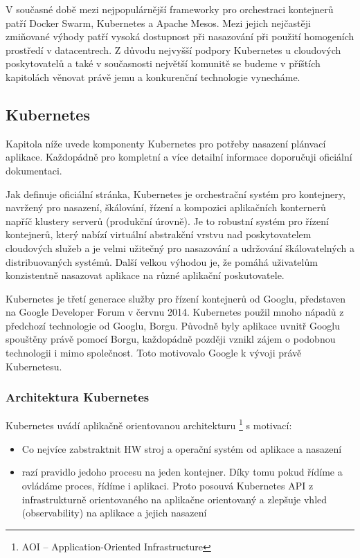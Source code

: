 \documentclass[thesis=M,czech]{FITthesis}[2019/12/23]
\theoremstyle{plain}
\theoremstyle{definition}
\begin{document}
V současné době mezi nejpopulárnější frameworky pro orchestraci kontejnerů patří Docker Swarm, Kubernetes a Apache Mesos. Mezi jejich nejčastěji zmiňované výhody patří vysoká dostupnost při nasazování při použití homogeních prostředí v datacentrech. Z důvodu nejvyšší podpory Kubernetes u cloudových poskytovatelů a také v současnosti největší komunitě se budeme v příštích kapitolách věnovat právě jemu a konkurenční technologie vynecháme.

\subsection{Kubernetes}

Kapitola níže uvede komponenty Kubernetes pro potřeby nasazení plánvací aplikace. Každopádně pro kompletní a více detailní informace doporučuji oficiální dokumentaci. 

Jak definuje oficiální stránka, Kubernetes je orchestrační systém pro kontejnery, navržený pro nasazení, škálování, řízení a kompozici aplikačních konternerů napříč klustery serverů (produkční úrovně). Je to robustní systém pro řízení  kontejnerů, který nabízí virtuální abstrakční vrstvu nad poskytovatelem cloudových služeb a je velmi užitečný pro nasazování a udržování škálovatelných a distribuovaných systémů. Další velkou výhodou je, že pomáhá uživatelům konzistentně nasazovat aplikace na různé aplikační poskutovatele.

Kubernetes je třetí generace služby pro řízení kontejnerů od Googlu, představen na Google Developer Forum v červnu 2014. Kubernetes použil mnoho nápadů z předchozí technologie od Googlu, Borgu. Původně byly aplikace uvnitř Googlu spouštěny právě pomocí Borgu, každopádně později vznikl zájem o podobnou technologii i mimo společnost. Toto motivovalo Google k vývoji právě Kubernetesu.  

\subsubsection{Architektura Kubernetes}


Kubernetes uvádí aplikačně orientovanou architekturu \footnote{AOI -- Application-Oriented Infrastructure}\cite{as-k8s-san-kho-lin} s motivací:

\begin{itemize}  
\item  Co nejvíce zabstraktnit HW stroj a operační systém od aplikace a nasazení 
\item  razí pravidlo jedoho procesu na jeden kontejner. Díky tomu pokud řídíme a ovládáme proces, řídíme i aplikaci. Proto posouvá Kubernetes API z infrastrukturně orientovaného na aplikačne orientovaný a zlepšuje vhled (observability) na aplikace a jejich nasazení
\end{itemize}
\end{document}
